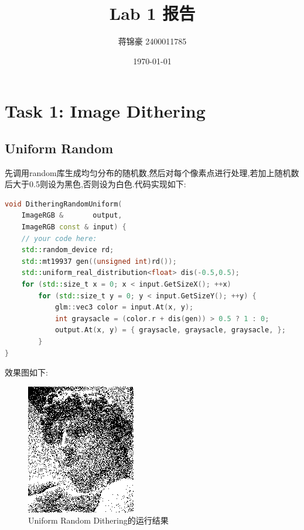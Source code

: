 \documentclass{ctexart}
\title{\textbf{Lab 1 报告}}
\author{蒋锦豪 2400011785}
\date{\today}
\begin{document}
\maketitle
\section*{Task 1: Image Dithering}
\subsection*{Uniform Random}
先调用{\codefont random}库生成均匀分布的随机数,然后对每个像素点进行处理,若加上随机数后大于0.5则设为黑色,否则设为白色.代码实现如下:
\begin{lstlisting}[language=C++]
void DitheringRandomUniform(
    ImageRGB &       output,
    ImageRGB const & input) {
    // your code here:
    std::random_device rd;
    std::mt19937 gen((unsigned int)rd());
    std::uniform_real_distribution<float> dis(-0.5,0.5);
    for (std::size_t x = 0; x < input.GetSizeX(); ++x)
        for (std::size_t y = 0; y < input.GetSizeY(); ++y) {
            glm::vec3 color = input.At(x, y);
            int graysacle = (color.r + dis(gen)) > 0.5 ? 1 : 0;
            output.At(x, y) = { graysacle, graysacle, graysacle, };
        }
}
\end{lstlisting}
效果图如下:
\begin{figure}[H]
    \centering\includegraphics[scale=0.75]{figure/UniformRandom.png}
    \caption{Uniform Random Dithering的运行结果}
\end{figure}
\end{document}
